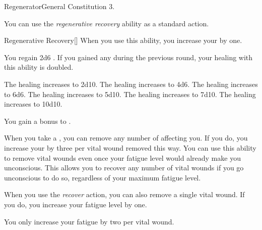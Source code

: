     \begin{feat}{Regenerator}{General}
        \featpre Constitution 3.

         You can use the \textit{regenerative recovery} ability as a standard action.
        \begin{activeability}{Regenerative Recovery}[]
            \rankline
            When you use this ability, you increase your  by one.

            You regain 2d6 .
            If you gained any  during the previous round, your healing with this ability is doubled.

            \rankline
             The healing increases to 2d10.
             The healing increases to 4d6.
             The healing increases to 6d6.
             The healing increases to 5d10.
             The healing increases to 7d10.
             The healing increases to 10d10.
        \end{activeability}

         You gain a  bonus to .

         When you take a , you can remove any number of  affecting you.
        If you do, you increase your  by three per vital wound removed this way.
        You can use this ability to remove vital wounds even once your fatigue level would already make you unconscious.
        This allows you to recover any number of vital wounds if you go unconscious to do so, regardless of your maximum fatigue level.

         When you use the \textit{recover} action, you can also remove a single vital wound.
        If you do, you increase your fatigue level by one.

         You only increase your fatigue by two per vital wound.
    \end{feat}

